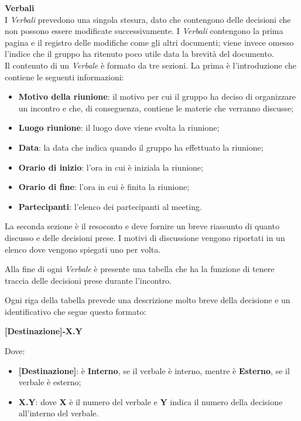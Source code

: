 \textbf{Verbali}\\
I \textit{Verbali} prevedono una singola stesura, dato che contengono delle decisioni che non possono essere modificate successivamente. I \textit{Verbali} contengono la prima pagina e il registro delle modifiche come gli altri documenti; viene invece omesso l'indice che il gruppo ha ritenuto poco utile data la brevità del documento.\\ Il contenuto di un \textit{Verbale} è formato da tre sezioni. La prima è l'introduzione che contiene le seguenti informazioni:
\begin{itemize}
	
	\item \textbf{Motivo della riunione}: il motivo per cui il gruppo ha deciso di organizzare un incontro e che, di conseguenza, contiene le materie che verranno discusse;
	
	\item \textbf{Luogo riunione}: il luogo dove viene svolta la riunione;
	
	\item \textbf{Data}: la data che indica quando il gruppo ha effettuato la riunione;
	
	\item \textbf{Orario di inizio}: l'ora in cui è iniziala la riunione;
	
	\item \textbf{Orario di fine}: l'ora in cui è finita la riunione;
	
	\item \textbf{Partecipanti}: l'elenco dei partecipanti al meeting.
\end{itemize}

La seconda sezione è il resoconto e deve fornire un breve riassunto di quanto discusso e delle decisioni prese. I motivi di discussione vengono riportati in un elenco dove vengono spiegati uno per volta.

Alla fine di ogni \textit{Verbale} è presente una tabella che ha la funzione di tenere traccia delle decisioni prese durante l'incontro. 

\newpage

Ogni riga della tabella prevede una descrizione molto breve della decisione e un identificativo che segue questo formato:
\begin{center}
\textbf{[Destinazione]-X.Y}
\end{center}
Dove: 

\begin{itemize}

	\item \textbf{[Destinazione]}: è \textbf{Interno}, se il verbale è interno, mentre è \textbf{Esterno}, se il verbale è esterno;
	
	\item \textbf{X.Y}: dove \textbf{X} è il numero del verbale e \textbf{Y} indica il numero della decisione all'interno del verbale.
\end{itemize}

